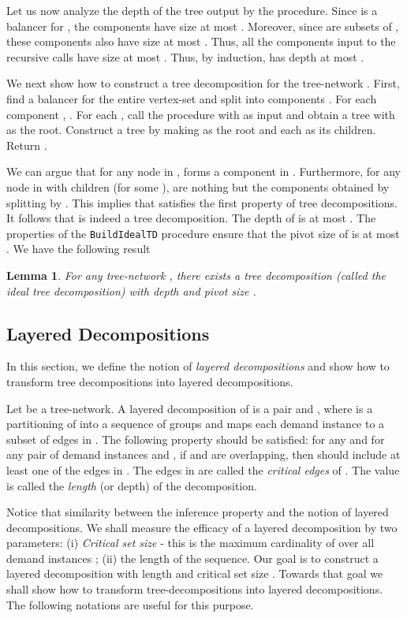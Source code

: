 \documentclass[11pt]{article}
\newtheorem{lemma}[theorem]{\bf Lemma}
\newcommand{\BuildITD} {{\tt BuildIdealTD}}
\begin{document}
Let us now analyze the depth of the tree  output by the procedure.
Since  is a balancer for , the components  have size at most .
Moreover, since  are subsets of ,
these components also have size at most .
Thus, all the components input to the recursive calls have size at most . 
Thus, by induction,  has depth at most .

We next show how to construct a tree decomposition  for the tree-network .
First, find a balancer  for the entire vertex-set  and split  into components
. For each component , .
For each , call the procedure 
with  as input and obtain a tree  with  as the root.
Construct a tree  by making  as the root and each  as its children.
Return .

We can argue that for any node  in ,  forms a component in .
Furthermore, for any node  in  with children  (for some ),
 are nothing but the components obtained by splitting  by .
This implies that  satisfies the first property of tree decompositions.
It follows that  is indeed a tree decomposition.
The depth of  is at most . The properties of the {\BuildITD} procedure
ensure that the pivot size of  is at most . We have the following result

\begin{lemma}
\label{lem:BBB}
For any tree-network , there exists a tree decomposition  (called the ideal tree decomposition)
with depth  and pivot size .
\end{lemma}

\subsection{Layered Decompositions}
In this section, we define the notion of {\em layered decompositions} and 
show how to transform tree decompositions into layered decompositions.

Let  be a tree-network. A layered decomposition of  is a pair 
 and , where  is a partitioning of  into a
sequence of groups  and  maps each demand instance 
to a subset of edges in . The following property should be satisfied:
for any  and for any pair of demand instances  and ,
if  and  are overlapping, then  should include at least one of the 
edges in . The edges in  are called the {\em critical edges} of .
The value  is called the {\em length} (or depth) of the decomposition.

Notice that similarity between the inference property and the notion of layered decompositions.
We shall measure the efficacy of a layered decomposition by two parameters:
(i) {\it Critical set size } -  this is the maximum cardinality of  over all 
demand instances ; (ii) the length  of the sequence.
Our goal is to construct a layered decomposition with length 
and critical set size . Towards that goal we shall show how to transform 
tree-decompositions into layered decompositions. The following notations are useful for this purpose.
\end{document}
